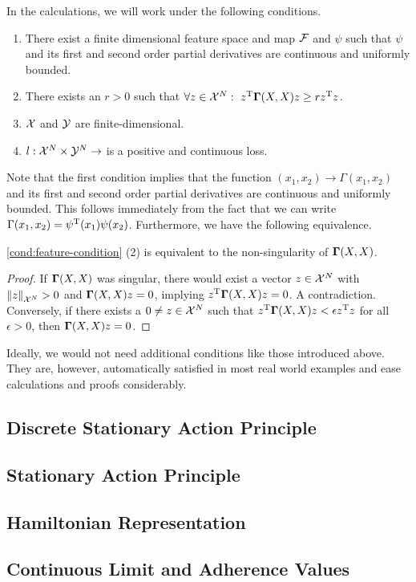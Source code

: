 In the calculations, we will work under the following conditions.
\begin{condition}
	\label{cond:feature-condition}\mbox{}
	\vspace*{-\parsep}
	\vspace*{-\baselineskip}
	\begin{enumerate}
		\item There exist a finite dimensional feature space and map $\mathcal{F}$ and $\psi$ such that $\psi$ and its first and second order partial derivatives are continuous and uniformly bounded.
		\item There exists an $r > 0$ such that $\forall z \in \mathcal{X}^N:~z^{\mathrm{T}} \mathbf{\Gamma}(X, X) z \geq r z^{\mathrm{T}} z$.
		\item $\mathcal{X}$ and $\mathcal{Y}$ are finite-dimensional.
		\item $l: \mathcal{X}^N \times \mathcal{Y}^N \rightarrow$ is a positive and continuous loss.
	\end{enumerate}
\end{condition}
Note that the first condition implies that the function $(x_1, x_2) \rightarrow \Gamma(x_1, x_2)$ and its first and second order partial derivatives are continuous and uniformly bounded.
This follows immediately from the fact that we can write $\Gamma(x_1, x_2) = \psi^{\mathrm{T}}(x_1)\psi(x_2)$.
Furthermore, we have the following equivalence.
\begin{lemma}
	\cref{cond:feature-condition} (2) is equivalent to the non-singularity of $\mathbf{\Gamma}(X, X)$.
\end{lemma}
\begin{proof}
	If $\mathbf{\Gamma}(X, X)$ was singular, there would exist a vector $z \in \mathcal{X}^N$ with $\norm{z}_{\mathcal{X}^N} > 0$ and $\mathbf{\Gamma}(X, X) z = 0$, implying $z^{\mathrm{T}} \mathbf{\Gamma}(X, X)z = 0$. 
	A contradiction.
	Conversely, if there exists a $0 \neq z \in \mathcal{X}^N$ such that $z^{\mathrm{T}} \mathbf{\Gamma}(X, X) z < \epsilon z^{\mathrm{T}} z$ for all $\epsilon > 0$, then $\mathbf{\Gamma}(X, X) z = 0$.
\end{proof}
Ideally, we would not need additional conditions like those introduced above.
They are, however, automatically satisfied in most real world examples and ease calculations and proofs considerably.

\subsection{Discrete Stationary Action Principle}



\subsection{Stationary Action Principle}



\subsection{Hamiltonian Representation}



\subsection{Continuous Limit and Adherence Values}


